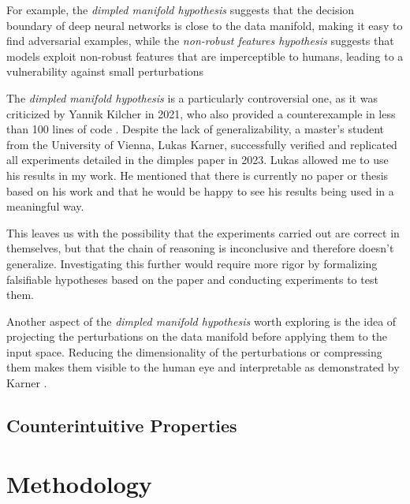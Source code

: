 \documentclass[a4paper, oneside]{discothesis}
\begin{document}
For example, the \textit{dimpled manifold hypothesis} \cite{shamir2021dimpled}  suggests that the decision boundary of deep neural networks is close to the data manifold, making it easy to find adversarial examples, while the \textit{non-robust features hypothesis} \cite{ilyas2019adversarial} suggests that models exploit non-robust features that are imperceptible to humans, leading to a vulnerability against small perturbations

The \textit{dimpled manifold hypothesis} is a particularly controversial one, as it was criticized by Yannik Kilcher \cite{kilcher2021dimpled} in 2021, who also provided a counterexample in less than 100 lines of code \cite{kilcher2021dimpledcode}. Despite the lack of generalizability, a master's student from the University of Vienna, Lukas Karner, successfully verified and replicated all experiments detailed in the dimples paper \cite{karner2023dimpled} in 2023. Lukas allowed me to use his results in my work. He mentioned that there is currently no paper or thesis based on his work and that he would be happy to see his results being used in a meaningful way.

This leaves us with the possibility that the experiments carried out are correct in themselves, but that the chain of reasoning is inconclusive and therefore doesn't generalize. Investigating this further would require more rigor by formalizing falsifiable hypotheses based on the paper and conducting experiments to test them.

Another aspect of the \textit{dimpled manifold hypothesis} worth exploring is the idea of projecting the perturbations on the data manifold before applying them to the input space. Reducing the dimensionality of the perturbations or compressing them makes them visible to the human eye and interpretable as demonstrated by Karner \cite{karner2023dimpled}.

\section{Counterintuitive Properties}



\chapter{Methodology}
\end{document}

